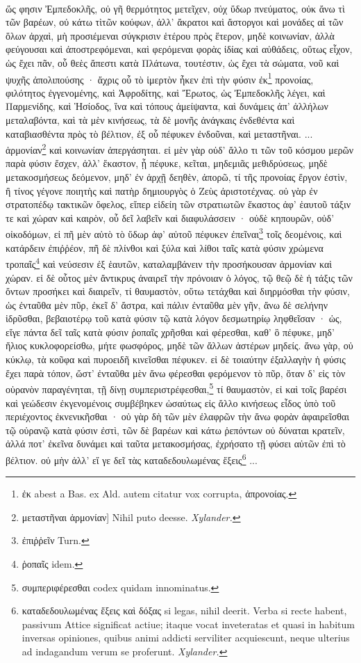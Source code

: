 \documentclass[a4paper, 11pt, oneside, polutonikogreek, german]{article}
\begin{document}
\paragraph{}
ὥς φησιν Ἐμπεδοκλῆς, οὐ γῆ θερμότητος μετεῖχεν, οὐχ ὕδωρ πνεύματος, οὐκ ἄνω τὶ τῶν βαρέων, οὐ κάτω τὶτῶν κούφων, ἀλλ' ἄκρατοι καὶ ἄστοργοι καὶ μονάδες αἱ τῶν ὅλων ἀρχαὶ, μὴ προσιέμεναι σύγκρισιν ἑτέρου πρὸς ἕτερον, μηδὲ κοινωνίαν, ἀλλὰ φεύγουσαι καὶ ἀποστρεφόμεναι, καὶ φερόμεναι φορὰς ἰδίας καὶ αὐθάδεις, οὕτως εἶχον, ὡς ἔχει πᾶν, οὗ θεὲς ἄπεστι κατὰ Πλάτωνα, τουτέστιν, ὡς ἔχει τὰ σώματα, νοῦ καὶ ψυχῆς ἀπολιπούσης · ἄχρις οὗ τὸ ἱμερτὸν ἧκεν ἐπὶ τὴν φύσιν ἐκ\footnote{ἐκ abest a Bas. ex Ald. autem citatur vox corrupta, ἀπρονοίας.} προνοίας, φιλότητος ἐγγενομένης, καὶ Ἀφροδίτης, καὶ Ἔρωτος, ὡς Ἐμπεδοκλῆς λέγει, καὶ Παρμενίδης, καὶ Ἡσίοδος, ἵνα καὶ τόπους ἀμείψαντα, καὶ δυνάμεις ἀπ' ἀλλήλων μεταλαβόντα, καὶ τὰ μὲν κινήσεως, τὰ δὲ μονῆς ἀνάγκαις ἐνδεθέντα καὶ καταβιασθέντα πρὸς τὸ βέλτιον, ἐξ οὗ πέφυκεν ἐνδοῦναι, καὶ μεταστῆναι. ... ἁρμονίαν\footnote{μεταστῆναι ἁρμονίαν] Nihil puto deesse. \emph{Xylander.}} καὶ κοινωνίαν ἀπεργάσηται. εἰ μὲν γὰρ οὐδ' ἄλλο τι τῶν τοῦ κόσμου μερῶν παρὰ φύσιν ἔσχεν, ἀλλ' ἕκαστον, ᾗ πέφυκε, κεῖται, μηδεμιᾶς μεθιδρύσεως, μηδὲ μετακοσμήσεως δεόμενον, μηδ' ἐν ἀρχῇ δεηθὲν, ἀπορῶ, τί τῆς προνοίας ἔργον ἐστὶν, ἢ τίνος γέγονε ποιητὴς καὶ πατὴρ δημιουργὸς ὁ Ζεὺς ἀριστοτέχνας. οὐ γὰρ ἐν στρατοπέδῳ τακτικῶν ὄφελος, εἴπερ εἰδείη τῶν στρατιωτῶν ἕκαστος ἀφ' ἑαυτοῦ τάξιν τε καὶ χώραν καὶ καιρὸν, οὗ δεῖ λαβεῖν καὶ διαφυλάσσειν · οὐδὲ κηπουρῶν, οὐδ' οἰκοδόμων, εἰ πῆ μὲν αὐτὸ τὸ ὕδωρ ἀφ' αὑτοῦ πέφυκεν ἐπεῖναι\footnote{ἐπιῤῥεῖν Turn.} τοῖς δεομένοις, καὶ κατάρδειν ἐπιῤῥέον, πῆ δὲ πλίνθοι καὶ ξύλα καὶ λίθοι ταῖς κατὰ φύσιν χρώμενα τροπαῖς\footnote{ῥοπαῖς idem.} καὶ νεύσεσιν ἐξ ἑαυτῶν, καταλαμβάνειν τὴν προσήκουσαν ἁρμονίαν καὶ χώραν. εἰ δὲ οὗτος μὲν ἄντικρυς ἀναιρεῖ τὴν πρόνοιαν ὁ λόγος, τῷ θεῷ δὲ ἡ τάξις τῶν ὄντων προσήκει καὶ διαιρεῖν, τί θαυμαστὸν, οὕτω τετάχθαι καὶ διηρμόσθαι τὴν φύσιν, ὡς ἐνταῦθα μὲν πῦρ, ἐκεῖ δ' ἄστρα, καὶ πάλιν ἐνταῦθα μὲν γῆν, ἄνω δὲ σελήνην ἱδρῦσθαι, βεβαιοτέρῳ τοῦ κατὰ φύσιν τῷ κατὰ λόγον δεσμωτηρίῳ ληφθεῖσαν · ὡς, εἴγε πάντα δεῖ ταῖς κατὰ φύσιν ῥοπαῖς χρῆσθαι καὶ φέρεσθαι, καθ' ὃ πέφυκε, μηδ' ἥλιος κυκλοφορείσθω, μήτε φωσφόρος, μηδὲ τῶν ἄλλων ἀστέρων μηδείς. ἄνω γὰρ, οὐ κύκλῳ, τὰ κοῦφα καὶ πυροειδῆ κινεῖσθαι πέφυκεν. εἰ δὲ τοιαύτην ἐξαλλαγὴν ἡ φύσις ἔχει παρὰ τόπον, ὥστ' ἐνταῦθα μὲν ἄνω φέρεσθαι φερόμενον τὸ πῦρ, ὅταν δ' εἰς τὸν οὐρανὸν παραγένηται, τῇ δίνῃ συμπεριστρέφεσθαι,\footnote{συμπεριφέρεσθαι codex quidam innominatus.} τί θαυμαστὸν, εἰ καὶ τοῖς βαρέσι καὶ γεώδεσιν ἐκγενομένοις συμβέβηκεν ὡσαύτως εἰς ἄλλο κινήσεως εἶδος ὑπὸ τοῦ περιέχοντος ἐκνενικῆσθαι · οὐ γὰρ δὴ τῶν μὲν ἐλαφρῶν τὴν ἄνω φορὰν ἀφαιρεῖσθαι τῷ οὐρανῷ κατὰ φύσιν ἐστὶ, τῶν δὲ βαρέων καὶ κάτω ῥεπόντων οὐ δύναται κρατεῖν, ἀλλά ποτ' ἐκεῖνα δυνάμει καὶ ταῦτα μετακοσμήσας, ἐχρήσατο τῇ φύσει αὐτῶν ἐπὶ τὸ βέλτιον. οὐ μὴν ἀλλ' εἴ γε δεῖ τὰς καταδεδουλωμένας ἕξεις\footnote{καταδεδουλωμένας ἕξεις καὶ δόξας si legas, nihil deerit. Verba si recte habent, passivum Attice significat actiue; itaque vocat inveteratas et quasi in habitum inversas opiniones, quibus animi addicti serviliter acquiescunt, neque ulterius ad indagandum verum se proferunt. \emph{Xylander.}} ... 
\end{document}
